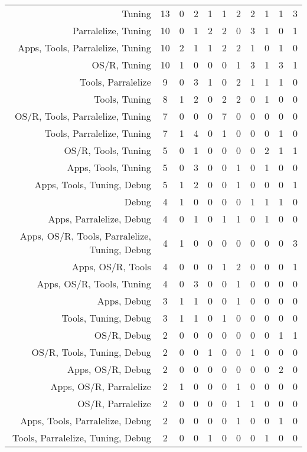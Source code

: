 {\begin{landscape}
\begin{longtable}[htb]{r|c|c|c|c|c|c|c|c|c|c}
{Tuning} & 13 & 0 & 2 & 1 & 1 & 2 & 2 & 1 & 1 & 3 \\%
{Parralelize, Tuning} & 10 & 0 & 1 & 2 & 2 & 0 & 3 & 1 & 0 & 1 \\%
{Apps, Tools, Parralelize, Tuning} & 10 & 2 & 1 & 1 & 2 & 2 & 1 & 0 & 1 & 0 \\%
{OS/R, Tuning} & 10 & 1 & 0 & 0 & 0 & 1 & 3 & 1 & 3 & 1 \\%
{Tools, Parralelize} & 9 & 0 & 3 & 1 & 0 & 2 & 1 & 1 & 1 & 0 \\%
{Tools, Tuning} & 8 & 1 & 2 & 0 & 2 & 2 & 0 & 1 & 0 & 0 \\%
{OS/R, Tools, Parralelize, Tuning} & 7 & 0 & 0 & 0 & 7 & 0 & 0 & 0 & 0 & 0 \\%
{Tools, Parralelize, Tuning} & 7 & 1 & 4 & 0 & 1 & 0 & 0 & 0 & 1 & 0 \\%
{OS/R, Tools, Tuning} & 5 & 0 & 1 & 0 & 0 & 0 & 0 & 2 & 1 & 1 \\%
{Apps, Tools, Tuning} & 5 & 0 & 3 & 0 & 0 & 1 & 0 & 1 & 0 & 0 \\%
{Apps, Tools, Tuning, Debug} & 5 & 1 & 2 & 0 & 0 & 1 & 0 & 0 & 0 & 1 \\%
{Debug} & 4 & 1 & 0 & 0 & 0 & 0 & 1 & 1 & 1 & 0 \\%
{Apps, Parralelize, Debug} & 4 & 0 & 1 & 0 & 1 & 1 & 0 & 1 & 0 & 0 \\%
{Apps, OS/R, Tools, Parralelize, Tuning, Debug} & 4 & 1 & 0 & 0 & 0 & 0 & 0 & 0 & 0 & 3 \\%
{Apps, OS/R, Tools} & 4 & 0 & 0 & 0 & 1 & 2 & 0 & 0 & 0 & 1 \\%
{Apps, OS/R, Tools, Tuning} & 4 & 0 & 3 & 0 & 0 & 1 & 0 & 0 & 0 & 0 \\%
{Apps, Debug} & 3 & 1 & 1 & 0 & 0 & 1 & 0 & 0 & 0 & 0 \\%
{Tools, Tuning, Debug} & 3 & 1 & 1 & 0 & 1 & 0 & 0 & 0 & 0 & 0 \\%
{OS/R, Debug} & 2 & 0 & 0 & 0 & 0 & 0 & 0 & 0 & 1 & 1 \\%
{OS/R, Tools, Tuning, Debug} & 2 & 0 & 0 & 1 & 0 & 0 & 1 & 0 & 0 & 0 \\%
{Apps, OS/R, Debug} & 2 & 0 & 0 & 0 & 0 & 0 & 0 & 0 & 2 & 0 \\%
{Apps, OS/R, Parralelize} & 2 & 1 & 0 & 0 & 0 & 1 & 0 & 0 & 0 & 0 \\%
{OS/R, Parralelize} & 2 & 0 & 0 & 0 & 0 & 1 & 1 & 0 & 0 & 0 \\%
{Apps, Tools, Parralelize, Debug} & 2 & 0 & 0 & 0 & 0 & 1 & 0 & 0 & 1 & 0 \\%
{Tools, Parralelize, Tuning, Debug} & 2 & 0 & 0 & 1 & 0 & 0 & 0 & 1 & 0 & 0 \\%

\end{longtable}
\end{landscape}}
